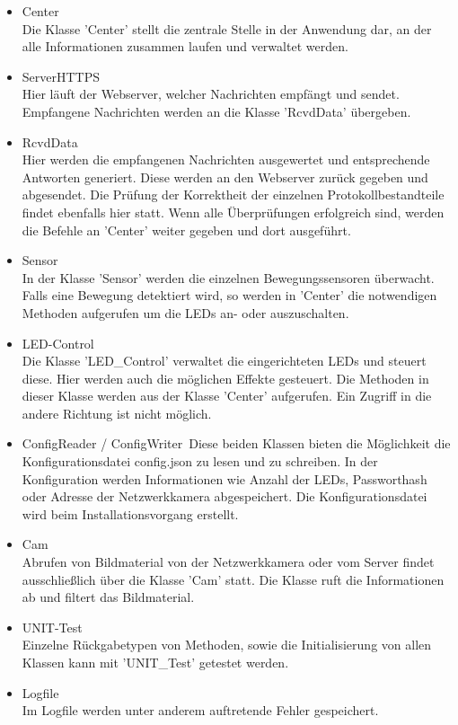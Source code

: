 \begin{itemize}
\item Center\\
Die Klasse 'Center' stellt die zentrale Stelle in der Anwendung dar, an der alle Informationen zusammen laufen und verwaltet werden.
\item ServerHTTPS\\
Hier läuft der Webserver, welcher Nachrichten empfängt und sendet. Empfangene Nachrichten werden an die Klasse 'RcvdData' übergeben.
\item RcvdData\\
Hier werden die empfangenen Nachrichten ausgewertet und entsprechende Antworten generiert. Diese werden an den Webserver zurück gegeben und abgesendet. Die Prüfung der Korrektheit der einzelnen Protokollbestandteile findet ebenfalls hier statt. Wenn alle Überprüfungen erfolgreich sind, werden die Befehle an 'Center' weiter gegeben und dort ausgeführt.
\item Sensor\\
In der Klasse 'Sensor' werden die einzelnen Bewegungssensoren überwacht. Falls eine Bewegung detektiert wird, so werden in 'Center' die notwendigen Methoden aufgerufen um die LEDs an- oder auszuschalten.
\item LED-Control\\
Die Klasse 'LED\_Control' verwaltet die eingerichteten LEDs und steuert diese. Hier werden auch die möglichen Effekte gesteuert. Die Methoden in dieser Klasse werden aus der Klasse 'Center' aufgerufen. Ein Zugriff in die andere Richtung ist nicht möglich.
\item ConfigReader / ConfigWriter\
Diese beiden Klassen bieten die Möglichkeit die Konfigurationsdatei config.json zu lesen und zu schreiben. In der Konfiguration werden Informationen wie Anzahl der LEDs, Passworthash oder Adresse der Netzwerkkamera abgespeichert. Die Konfigurationsdatei wird beim Installationsvorgang erstellt.
\item Cam\\
Abrufen von Bildmaterial von der Netzwerkkamera oder vom Server findet ausschließlich über die Klasse 'Cam' statt. Die Klasse ruft die Informationen ab und filtert das Bildmaterial.
\item UNIT-Test\\
Einzelne Rückgabetypen von Methoden, sowie die Initialisierung von allen Klassen kann mit 'UNIT\_Test' getestet werden.
\item Logfile\\
Im Logfile werden unter anderem auftretende Fehler gespeichert.
\end{itemize}

